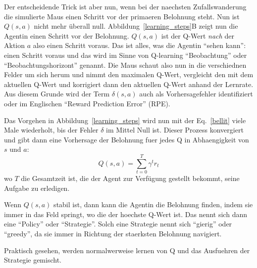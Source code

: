 \documentclass[12pt]{report}
\begin{document}
Der entscheidende Trick ist aber nun, wenn bei der naechsten Zufallswanderung die simulierte Maus
einen Schritt vor der primaeren Belohnung steht. Nun ist $Q(s,a)$ nicht mehr überall null. Abbildung~\ref{learning_steps}B
zeigt nun die Agentin einen Schritt vor der Belohnung. $Q(s,a)$ ist der Q-Wert \textsl{nach} der Aktion $a$ also einen
Schritt voraus. Das ist alles, was die Agentin ``sehen kann'': einen Schritt voraus und das wird im Sinne von
Q-learning ``Beobachtung'' oder ``Beobachtungshorizont'' genannt. Die Maus schaut also nun in die verschiednen Felder
um sich herum und nimmt den maximalen Q-Wert, vergleicht den mit dem aktuellen Q-Wert und korrigiert dann den aktuellen
Q-Wert anhand der Lernrate. Aus diesem Grunde wird der Term $\delta(s,a)$ auch als Vorhersagefehler identifiziert oder
im Englischen ``Reward Prediction Error'' (RPE).

Das Vorgehen in Abbildung~\ref{learning_steps} wird nun mit der Eq.~\ref{bellit} viele Male wiederholt, bis der
Fehler $\delta$ im Mittel Null ist. Dieser Prozess konvergiert und gibt dann eine Vorhersage der Belohnung
fuer jedes Q in Abhaengigkeit von $s$ und $a$:
\begin{equation}
  Q(s,a) = \sum_{t=0}^T \gamma^t r_t
\end{equation}
wo $T$ die Gesamtzeit ist, die der Agent zur Verfügung gestellt
bekommt, seine Aufgabe zu erledigen.

Wenn $Q(s,a)$ stabil ist, dann kann die Agentin die Belohnung finden, indem sie immer in das Feld springt,
wo die der hoechste Q-Wert ist. Das nennt sich dann eine ``Policy'' oder ``Strategie''. Solch eine Strategie
nennt sich ``gierig'' oder ``greedy'', da sie immer in Richtung der staerksten Belohnung navigiert.

Praktisch gesehen, werden normalwerweise lernen von Q und das Ausfuehren der Strategie gemischt.
\end{document}
